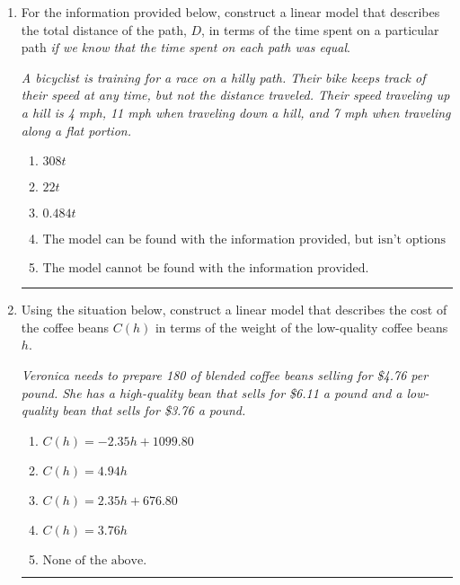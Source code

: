 \documentclass[14pt]{extbook}
\newcommand{\litem}[1]{\item#1\hspace*{-1cm}\rule{\textwidth}{0.4pt}}
\begin{document}
\begin{enumerate}
{\begin{enumerate}[label=\Alph*.]
\end{enumerate} }
\litem{
For the information provided below, construct a linear model that describes the total distance of the path, $D$, in terms of the time spent on a particular path \textit{if we know that the time spent on each path was equal}.
\begin{center}
    \textit{ A bicyclist is training for a race on a hilly path. Their bike keeps track of their speed at any time, but not the distance traveled. Their speed traveling up a hill is 4 mph, 11 mph when traveling down a hill, and 7 mph when traveling along a flat portion. }
\end{center}
\begin{enumerate}[label=\Alph*.]
\item \( 308 t \)
\item \( 22 t \)
\item \( 0.484 t \)
\item \( \text{The model can be found with the information provided, but isn't options 1-3.} \)
\item \( \text{The model cannot be found with the information provided.} \)

\end{enumerate} }
\litem{
Using the situation below, construct a linear model that describes the cost of the coffee beans $C(h)$ in terms of the weight of the low-quality coffee beans $h$.
\begin{center}
    \textit{ Veronica needs to prepare 180 of blended coffee beans selling for \$4.76 per pound. She has a high-quality bean that sells for \$6.11 a pound and a low-quality bean that sells for \$3.76 a pound. }
\end{center}
\begin{enumerate}[label=\Alph*.]
\item \( C(h) = -2.35 h + 1099.80 \)
\item \( C(h) = 4.94 h \)
\item \( C(h) = 2.35 h + 676.80 \)
\item \( C(h) = 3.76 h \)
\item \( \text{None of the above.} \)

\end{enumerate} }
\end{enumerate}
\end{document}
